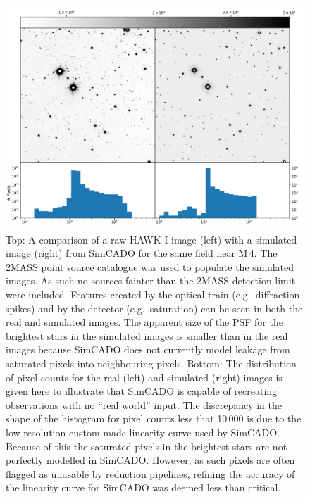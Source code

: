 \begin{figure}

    \centering
    \includegraphics[width=\textwidth]{images/HAWKI_vs_HAWKado_images_quarter}
    
    \caption{Top: A comparison of a raw HAWK-I image (left) with a simulated image (right) from SimCADO for the same field near M\,4. The 2MASS point source catalogue was used to populate the simulated images. As such no sources fainter than the 2MASS detection limit were included. Features created by the optical train (e.g.~diffraction spikes) and by the detector (e.g.~saturation) can be seen in both the real and simulated images. The apparent size of the PSF for the brightest stars in the simulated images is smaller than in the real images because SimCADO does not currently model leakage from saturated pixels into neighbouring pixels. Bottom: The distribution of pixel counts for the real (left) and simulated (right) images is given here to illustrate that SimCADO is capable of recreating observations with no ``real world'' input. The discrepancy in the shape of the histogram for pixel counts less that 10\,000 is due to the low resolution custom made linearity curve used by SimCADO. Because of this the saturated pixels in the brightest stars are not perfectly modelled in SimCADO. However, as such pixels are often flagged as unusable by reduction pipelines, refining the accuracy of the linearity curve for SimCADO was deemed less than critical.}
    \label{fig:img_comparison}
    
\end{figure}


